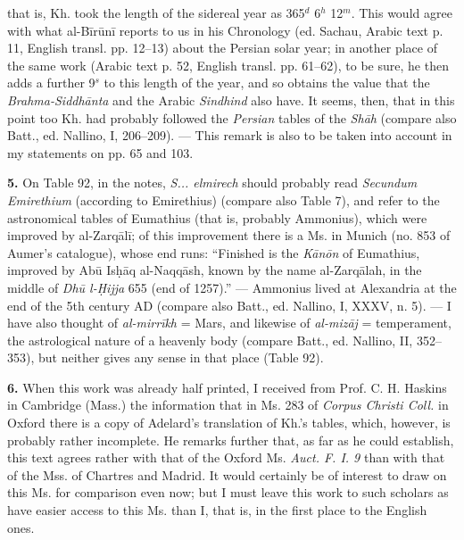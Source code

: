 \documentclass[11pt]{article}
\newcommand{\Pg}[1]{\marginpar{\footnotesize\color{gray}#1}}
\begin{document}
\par \Pg{236}that is, Kh. took the length of the sidereal year as 365$^{d}$ 6$^{h}$ 12$^{m}$. This would agree with what al-Bīrūnī reports to us in his Chronology (ed. Sachau, Arabic text p. 11, English transl. pp. 12–13) about the Persian solar year; in another place of the same work (Arabic text p. 52, English transl. pp. 61–62), to be sure, he then adds a further 9$^{s}$ to this length of the year, and so obtains the value that the \emph{Brahma-Siddhānta} and the Arabic \emph{Sindhind} also have. It seems, then, that in this point too Kh. had probably followed the \emph{Persian} tables of the \emph{Shāh} (compare also Batt., ed. Nallino, I, 206–209). — This remark is also to be taken into account in my statements on pp. 65 and 103.\par
\par \textbf{5.} On Table 92, in the notes, \emph{S... elmirech} should probably read \emph{Secundum Emirethium} (according to Emirethius) (compare also Table 7), and refer to the astronomical tables of Eumathius (that is, probably Ammonius), which were improved by al-Zarqālī; of this improvement there is a Ms. in Munich (no. 853 of Aumer's catalogue), whose end runs: “Finished is the \emph{Kānōn} of Eumathius, improved by Abū Isḥāq al-Naqqāsh, known by the name al-Zarqālah, in the middle of \emph{Dhū l-Ḥijja} 655 (end of 1257).” — Ammonius lived at Alexandria at the end of the 5th century AD (compare also Batt., ed. Nallino, I, XXXV, n. 5). — I have also thought of \emph{al-mirrīkh} = Mars, and likewise of \emph{al-mizāj} = temperament, the astrological nature of a heavenly body (compare Batt., ed. Nallino, II, 352–353), but neither gives any sense in that place (Table 92).\par
\par \textbf{6.} When this work was already half printed, I received from Prof. C. H. Haskins in Cambridge (Mass.) the information that in Ms. 283 of \emph{Corpus Christi Coll.} in Oxford there is a copy of Adelard's translation of Kh.'s tables, which, however, is probably rather incomplete. He remarks further that, as far as he could establish, this text agrees rather with that of the Oxford Ms. \emph{Auct. F. I. 9} than with that of the Mss. of Chartres and Madrid. It would certainly be of interest to draw on this Ms. for comparison even now; but I must leave this work to such scholars as have easier access to this Ms. than I, that is, in the first place to the English ones.\par
\end{document}
